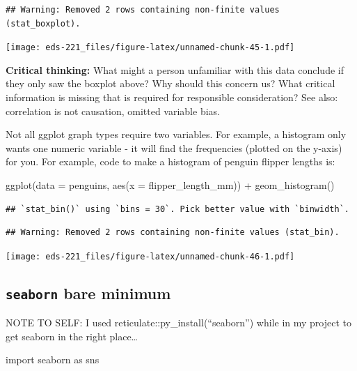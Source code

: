 \documentclass[
]{book}
\newenvironment{Shaded}{\begin{snugshade}}{\end{snugshade}}
\newcommand{\AttributeTok}[1]{\textcolor[rgb]{0.77,0.63,0.00}{#1}}
\newcommand{\FunctionTok}[1]{\textcolor[rgb]{0.00,0.00,0.00}{#1}}
\newcommand{\ImportTok}[1]{#1}
\newcommand{\NormalTok}[1]{#1}
\newcommand{\SpecialCharTok}[1]{\textcolor[rgb]{0.00,0.00,0.00}{#1}}
\begin{document}
\begin{verbatim}
## Warning: Removed 2 rows containing non-finite values (stat_boxplot).
\end{verbatim}

\texttt{[image: eds-221\_files/figure-latex/unnamed-chunk-45-1.pdf]}

\textbf{Critical thinking:} What might a person unfamiliar with this data conclude if they only saw the boxplot above? Why should this concern us? What critical information is missing that is required for responsible consideration? See also: correlation is not causation, omitted variable bias.

Not all ggplot graph types require two variables. For example, a histogram only wants one numeric variable - it will find the frequencies (plotted on the y-axis) for you. For example, code to make a histogram of penguin flipper lengths is:

\begin{Shaded}
\begin{Highlighting}[]
\FunctionTok{ggplot}\NormalTok{(}\AttributeTok{data =}\NormalTok{ penguins, }\FunctionTok{aes}\NormalTok{(}\AttributeTok{x =}\NormalTok{ flipper\_length\_mm)) }\SpecialCharTok{+}
  \FunctionTok{geom\_histogram}\NormalTok{()}
\end{Highlighting}
\end{Shaded}

\begin{verbatim}
## `stat_bin()` using `bins = 30`. Pick better value with `binwidth`.
\end{verbatim}

\begin{verbatim}
## Warning: Removed 2 rows containing non-finite values (stat_bin).
\end{verbatim}

\texttt{[image: eds-221\_files/figure-latex/unnamed-chunk-46-1.pdf]}

\hypertarget{seaborn-bare-minimum}{%
\subsection{\texorpdfstring{\texttt{seaborn} bare minimum}{seaborn bare minimum}}\label{seaborn-bare-minimum}}

NOTE TO SELF: I used reticulate::py\_install(``seaborn'') while in my project to get seaborn in the right place\ldots{}

\begin{Shaded}
\begin{Highlighting}[]
\ImportTok{import}\NormalTok{ seaborn }\ImportTok{as}\NormalTok{ sns}
\end{Highlighting}
\end{Shaded}
\end{document}
